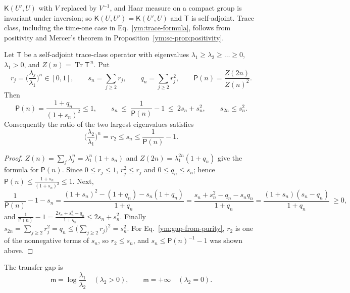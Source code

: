 $\mathsf K(U',U)$ with $V$ replaced by $V^{-1}$, and Haar measure on a
compact group is invariant under inversion; so
$\mathsf K(U,U')=\mathsf K(U',U)$ and $\mathsf T$ is self-adjoint.
Trace class, including the time-one case in Eq.~\eqref{ym:trace-formula},
follows from positivity and Mercer's theorem in Proposition~\ref{ym:sc-prop:positivity}.
\begin{proposition}[Purity]\label{ym:prop:purity}
Let $\mathsf T$ be a self-adjoint trace-class operator with eigenvalues
$\lambda_1\ge\lambda_2\ge\dots\ge0$, $\lambda_1>0$, and $Z(n)=\operatorname{Tr}
\mathsf T^{\,n}$. Put
\begin{equation}\label{ym:purity-defs}
 r_j=\Big(\frac{\lambda_j}{\lambda_1}\Big)^n\in[0,1],\qquad
 s_n=\sum_{j\ge2}r_j,\qquad q_n=\sum_{j\ge2}r_j^2,\qquad
 \mathsf P(n)=\frac{Z(2n)}{Z(n)^2}.
\end{equation}
Then
\begin{equation}\label{ym:purity-bounds}
 \mathsf P(n)=\frac{1+q_n}{(1+s_n)^2}\le1,\qquad
 s_n\ \le\ \frac{1}{\mathsf P(n)}-1\ \le\ 2s_n+s_n^2,\qquad
 s_{2n}\le s_n^2 .
\end{equation}
Consequently the ratio of the two largest eigenvalues satisfies
\begin{equation}\label{ym:gap-from-purity}
 \Big(\frac{\lambda_2}{\lambda_1}\Big)^n=r_2\le s_n\le\frac{1}{\mathsf P(n)}-1 .
\end{equation}
\end{proposition}
\begin{proof}
$Z(n)=\sum_j\lambda_j^n=\lambda_1^n(1+s_n)$ and
$Z(2n)=\lambda_1^{2n}(1+q_n)$ give the formula for $\mathsf P(n)$. Since
$0\le r_j\le1$, $r_j^2\le r_j$ and $0\le q_n\le s_n$; hence
$\mathsf P(n)\le\frac{1+s_n}{(1+s_n)^2}\le1$. Next,
\begin{equation}
 \frac{1}{\mathsf P(n)}-1-s_n
 =\frac{(1+s_n)^2-(1+q_n)-s_n(1+q_n)}{1+q_n}
 =\frac{s_n+s_n^2-q_n-s_nq_n}{1+q_n}
 =\frac{(1+s_n)(s_n-q_n)}{1+q_n}\ \ge0,
\end{equation}
and $\frac{1}{\mathsf P(n)}-1=\frac{2s_n+s_n^2-q_n}{1+q_n}\le2s_n+s_n^2$.
Finally $s_{2n}=\sum_{j\ge2}r_j^2=q_n\le\big(\sum_{j\ge2}r_j\big)^2=s_n^2$.
For Eq.~\eqref{ym:gap-from-purity}, $r_2$ is one of the nonnegative terms of
$s_n$, so $r_2\le s_n$, and $s_n\le\mathsf P(n)^{-1}-1$ was shown above.
\end{proof}
The transfer gap is
\begin{equation}\label{ym:transfer-gap}
 \mathsf m=\log\frac{\lambda_1}{\lambda_2}\quad(\lambda_2>0),\qquad
 \mathsf m=+\infty\quad(\lambda_2=0).
\end{equation}
